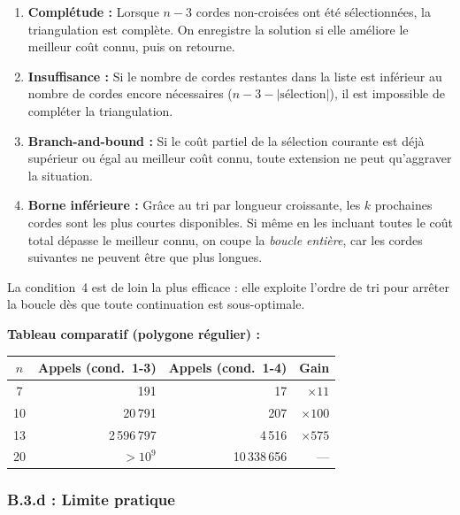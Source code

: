 \documentclass[12pt,a4paper]{article}
\begin{document}
\begin{enumerate}
  \item \textbf{Complétude :} Lorsque $n-3$ cordes non-croisées ont été sélectionnées,
        la triangulation est complète. On enregistre la solution si elle améliore le
        meilleur coût connu, puis on retourne.

  \item \textbf{Insuffisance :} Si le nombre de cordes restantes dans la liste est
        inférieur au nombre de cordes encore nécessaires ($n-3 - |\text{sélection}|$),
        il est impossible de compléter la triangulation.

  \item \textbf{Branch-and-bound :} Si le coût partiel de la sélection courante est déjà
        supérieur ou égal au meilleur coût connu, toute extension ne peut qu'aggraver
        la situation.

  \item \textbf{Borne inférieure :} Grâce au tri par longueur croissante, les $k$
        prochaines cordes sont les plus courtes disponibles. Si même en les incluant
        toutes le coût total dépasse le meilleur connu, on coupe la \emph{boucle
        entière}, car les cordes suivantes ne peuvent être que plus longues.
\end{enumerate}

La condition~4 est de loin la plus efficace : elle exploite l'ordre de tri pour arrêter
la boucle dès que toute continuation est sous-optimale.

\textbf{Tableau comparatif (polygone régulier) :}

\begin{center}
\begin{tabular}{crrr}
\toprule
$n$ & Appels (cond.~1-3) & Appels (cond.~1-4) & Gain \\
\midrule
  7 &              191   &               17   & $\times 11$  \\
 10 &           20\,791  &              207   & $\times 100$ \\
 13 &        2\,596\,797 &            4\,516  & $\times 575$ \\
 20 &         $>10^9$    &       10\,338\,656 & ---          \\
\bottomrule
\end{tabular}
\end{center}

\subsubsection*{B.3.d : Limite pratique}
\end{document}
